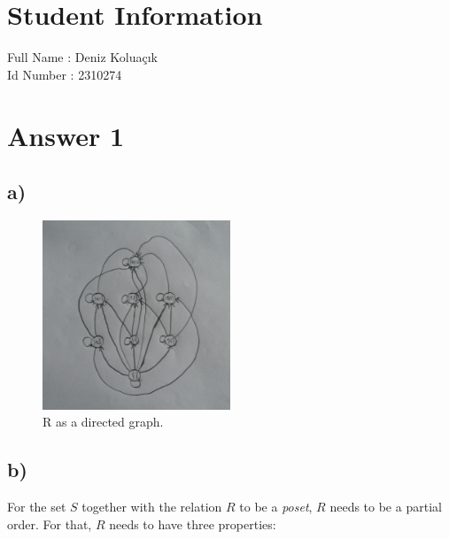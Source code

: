 \documentclass[11pt]{article}
\begin{document}
\section*{Student Information } 
Full Name : Deniz Koluaçık\\
Id Number : 2310274\\


\section*{Answer 1}
\subsection*{a)}
\begin{figure}[H]
    \centering\includegraphics[width=0.5\textwidth]{digraph.jpg}
    \caption{R as a directed graph.}
    \label{fig:digraph}
\end{figure}
\subsection*{b)}
For the set $S$ together with the relation $R$ to be a \textit{poset}, $R$ needs to be a partial order. For that, $R$ needs to have three properties:
\end{document}
